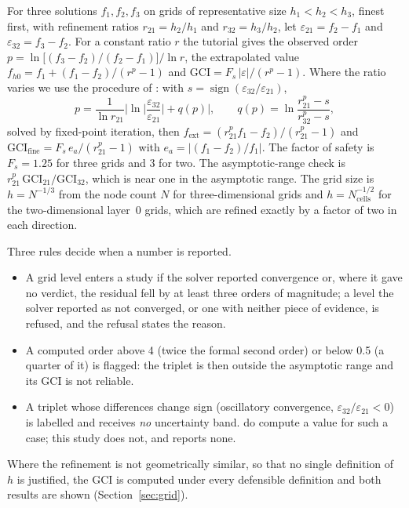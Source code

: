 \documentclass[11pt,a4paper]{article}
\newcommand{\fine}{\mathrm{fine}}
\begin{document}
For three solutions $f_1,f_2,f_3$ on grids of representative size $h_1<h_2<h_3$, finest first, with
refinement ratios $r_{21}=h_2/h_1$ and $r_{32}=h_3/h_2$, let $\varepsilon_{21}=f_2-f_1$ and
$\varepsilon_{32}=f_3-f_2$.
For a constant ratio $r$ the tutorial gives the observed order
$p=\ln\!\big[(f_3-f_2)/(f_2-f_1)\big]/\ln r$, the extrapolated value $f_{h0}=f_1+(f_1-f_2)/(r^p-1)$ and
$\mathrm{GCI}=F_s\,|\varepsilon|/(r^p-1)$.
Where the ratio varies we use the procedure of \citet{celik2008}: with $s=\operatorname{sign}(\varepsilon_{32}/\varepsilon_{21})$,
\begin{equation}
p=\frac{1}{\ln r_{21}}\Big|\ln\Big|\frac{\varepsilon_{32}}{\varepsilon_{21}}\Big|+q(p)\Big|,\qquad
q(p)=\ln\frac{r_{21}^{p}-s}{r_{32}^{p}-s},
\end{equation}
solved by fixed-point iteration, then
$f_\mathrm{ext}=(r_{21}^{p}f_1-f_2)/(r_{21}^{p}-1)$ and
$\mathrm{GCI}_\fine=F_s\,e_a/(r_{21}^{p}-1)$ with $e_a=|(f_1-f_2)/f_1|$.
The factor of safety is $F_s=1.25$ for three grids and $3$ for two.
The asymptotic-range check is $r_{21}^{p}\,\mathrm{GCI}_{21}/\mathrm{GCI}_{32}$, which is near one in the
asymptotic range.
The grid size is $h=N^{-1/3}$ from the node count $N$ for three-dimensional grids and $h=N_\mathrm{cells}^{-1/2}$ for the
two-dimensional layer~0 grids, which are refined exactly by a factor of two in each direction.

Three rules decide when a number is reported.
\begin{itemize}
\item A grid level enters a study if the solver reported convergence or, where it gave no verdict, the residual fell by at
  least three orders of magnitude; a level the solver reported as not converged, or one with neither piece of
  evidence, is refused, and the refusal states the reason.
\item A computed order above 4 (twice the formal second order) or below 0.5 (a quarter of it) is flagged: the
  triplet is then outside the asymptotic range and its GCI is not reliable.
\item A triplet whose differences change sign (oscillatory convergence, $\varepsilon_{32}/\varepsilon_{21}<0$) is
  labelled and receives \emph{no} uncertainty band.
  \citet{celik2008} do compute a value for such a case; this study does not, and reports none.
\end{itemize}
Where the refinement is not geometrically similar, so that no single definition of $h$ is justified, the GCI
is computed under every defensible definition and both results are shown (Section~\ref{sec:grid}).
\end{document}
